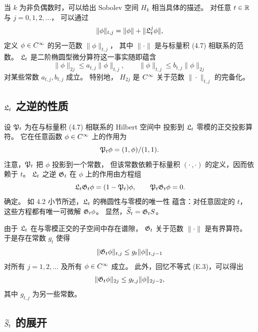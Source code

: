 当 $k$ 为非负偶数时，可以给出 Sobolev 空间 $H_k$ 相当具体的描述。
对任意 $t\in\mathbb{R}$ 与 $j=0,1,2,\ldots$，
可以通过
\begin{equation}
  \|\phi\|_{t,j}=\|\phi\|+\|\mathfrak{L}_t^j\phi\|,
\end{equation}
定义 $\phi\in C^{\infty}$ 的另一范数 $\|\phi\|_{t,j}$，
其中 $\|\cdot\|$ 是与标量积 (4.7) 相联系的范数。
$\mathfrak{L}_t$ 是二阶椭圆型微分算符这一事实随即蕴含
\begin{equation}
  \|\phi\|_{2j}\leq a_{t,j}\|\phi\|_{t,j},
  \qquad
  \|\phi\|_{t,j}\leq b_{t,j}\|\phi\|_{2j}
\end{equation}
对某些常数 $a_{t,j},b_{t,j}$ 成立。
特别地，
$H_{2j}$ 是 $C^{\infty}$ 关于范数 $\|\cdot\|_{t,j}$ 的完备化。


\subsection{$\mathfrak{L}_t$ 之逆的性质}

设 $\mathfrak{P}_t$ 为在与标量积 (4.7) 相联系的 Hilbert 空间中
投影到 $\mathfrak{L}_t$ 零模的正交投影算符。
它在任意函数 $\phi\in C^{\infty}$ 上的作用为
\begin{equation}
  \mathfrak{P}_t\phi=(1,\phi)/(1,1).
\end{equation}
注意，$\mathfrak{P}_t$ 把 $\phi$ 投影到一个常数，
但该常数依赖于标量积 $(\cdot\,,\cdot)$ 的定义，因而依赖于 $t$。
$\mathfrak{L}_t$ 之逆 $\mathfrak{G}_t$ 在 $\phi$ 上的作用由方程组
\begin{equation}
  \mathfrak{L}_t\mathfrak{G}_t\phi=(1-\mathfrak{P}_t)\phi,
  \qquad
  \mathfrak{P}_t\mathfrak{G}_t\phi=0.
\end{equation}
确定。
如 4.2 小节所述，$\mathfrak{L}_t$ 的椭圆性与零模的唯一性
蕴含：对任意固定的 $t$，
这些方程都有唯一可微解 $\mathfrak{G}_t\phi$。
显然，$\widetilde{S}_t=\mathfrak{G}_t S$。

由于 $\mathfrak{L}_t$ 在与零模正交的子空间中存在谱隙，
$\mathfrak{G}_t$ 关于范数 $\|\cdot\|$ 是有界算符。
于是存在常数 $g_t$ 使得
\begin{equation}
  \|\mathfrak{G}_t\phi\|_{t,j}\leq g_t\|\phi\|_{t,j-1}
\end{equation}
对所有 $j=1,2,\ldots$ 及所有 $\phi\in C^{\infty}$ 成立。
此外，回忆不等式 (E.3)，可以得出
\begin{equation}
  \|\mathfrak{G}_t\phi\|_{2j}\leq g_{t,j}\|\phi\|_{2j-2},
\end{equation}
其中 $g_{t,j}$ 为另一些常数。


\subsection{$\widetilde{S}_t$ 的展开}

